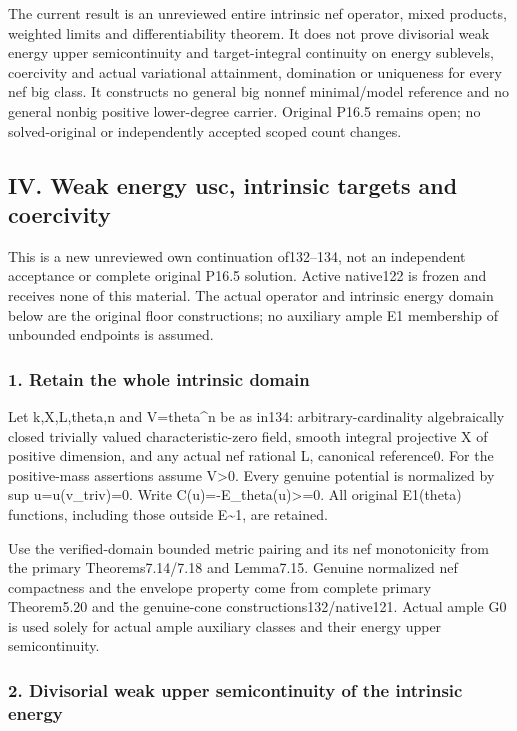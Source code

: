 \documentclass[
]{article}
\begin{document}
The current result is an unreviewed entire intrinsic nef
operator, mixed products, weighted limits and differentiability theorem. It does not prove
divisorial weak energy upper semicontinuity and target-integral
continuity on energy sublevels, coercivity and actual variational
attainment, domination or uniqueness for every nef big class. It
constructs no general big nonnef minimal/model reference and no general
nonbig positive lower-degree carrier. Original P16.5 remains open; no
solved-original or independently accepted scoped count changes.

\subsection{IV. Weak energy usc, intrinsic targets and
coercivity}\label{iv.-weak-energy-usc-intrinsic-targets-and-coercivity}

This is a new unreviewed own continuation of132--134, not an independent
acceptance or complete original P16.5 solution. Active native122 is
frozen and receives none of this material. The actual operator and
intrinsic energy domain below are the original floor constructions; no
auxiliary ample E1 membership of unbounded endpoints is assumed.

\subsubsection{1. Retain the whole intrinsic
domain}\label{retain-the-whole-intrinsic-domain}

Let k,X,L,theta,n and V=theta\^{}n be as in134: arbitrary-cardinality
algebraically closed trivially valued characteristic-zero field, smooth
integral projective X of positive dimension, and any actual nef rational
L, canonical reference0. For the positive-mass assertions assume
V\textgreater0. Every genuine potential is normalized by sup
u=u(v\_triv)=0. Write C(u)=-E\_theta(u)\textgreater=0. All original
E1(theta) functions, including those outside E\textasciitilde1, are
retained.

Use the verified-domain bounded metric pairing and its nef monotonicity
from the primary Theorems7.14/7.18 and Lemma7.15. Genuine normalized nef
compactness and the envelope property come from complete primary
Theorem5.20 and the genuine-cone constructions132/native121. Actual
ample G0 is used solely for actual ample auxiliary classes and their
energy upper semicontinuity.

\subsubsection{2. Divisorial weak upper semicontinuity of the intrinsic
energy}\label{divisorial-weak-upper-semicontinuity-of-the-intrinsic-energy}
\end{document}
